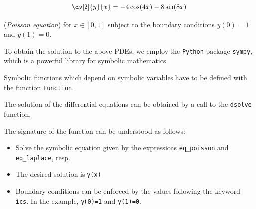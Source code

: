 \documentclass[
  a4paper,
  DIV=11,
  numbers=noendperiod]{scrreprt}
\providecommand{\tightlist}{%
  \setlength{\itemsep}{0pt}\setlength{\parskip}{0pt}}\usepackage{longtable,booktabs,array}
\begin{document}
\[
\dv[2]{y}{x} = -4\cos(4x) - 8 \sin(8 x)
\]

(\emph{Poisson equation}) for \(x \in [0, 1]\) subject to the boundary
conditions \(y(0)=1\) and \(y(1)=0\).

To obtain the solution to the above PDEs, we employ the \texttt{Python}
package \texttt{sympy}, which is a powerful library for symbolic
mathematics.

Symbolic functions which depend on symbolic variables have to be defined
with the function \texttt{Function}.

The solution of the differential equations can be obtained by a call to
the \texttt{dsolve} function.

The signature of the function can be understood as follows:

\begin{itemize}
\tightlist
\item
  Solve the symbolic equation given by the expressions
  \texttt{eq\_poisson} and \texttt{eq\_laplace}, resp.
\item
  The desired solution is \texttt{y(x)}
\item
  Boundary conditions can be enforced by the values following the
  keyword \texttt{ics}. In the example, \texttt{y(0)=1} and
  \texttt{y(1)=0}.
\end{itemize}
\end{document}
